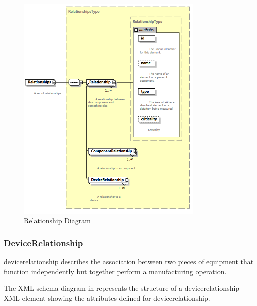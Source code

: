 \begin{figure}[ht]
  \centering
  \includegraphics[width=0.8\textwidth]{figures/relationship-schema-diagram.png}
  \caption{Relationship Diagram}
  \label{fig:relationship-diagram}
\end{figure}
\FloatBarrier

\subsubsection{DeviceRelationship}
\label{sec:DeviceRelationship}

\gls{devicerelationship} describes the association between two pieces of equipment that function independently but together perform a manufacturing operation.

The XML schema diagram in  represents the structure of a \gls{devicerelationship} XML element showing the attributes defined for \gls{devicerelationship}.

